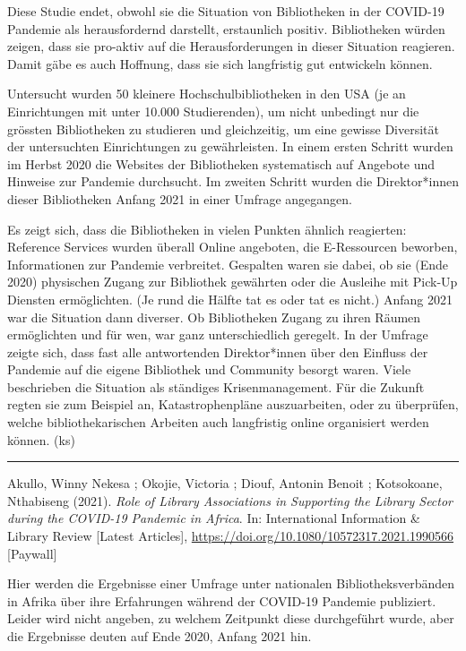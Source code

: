 \documentclass[a4paper,
fontsize=11pt,
oneside,
numbers=noperiodatend,
parskip=half-,
bibliography=totoc,
final
]{scrartcl}
\begin{document}
Diese Studie endet, obwohl sie die Situation von Bibliotheken in der
COVID-19 Pandemie als herausfordernd darstellt, erstaunlich positiv.
Bibliotheken würden zeigen, dass sie pro-aktiv auf die Herausforderungen
in dieser Situation reagieren. Damit gäbe es auch Hoffnung, dass sie
sich langfristig gut entwickeln können.

Untersucht wurden 50 kleinere Hochschulbibliotheken in den USA (je an
Einrichtungen mit unter 10.000 Studierenden), um nicht unbedingt nur die
grössten Bibliotheken zu studieren und gleichzeitig, um eine gewisse
Diversität der untersuchten Einrichtungen zu gewährleisten. In einem
ersten Schritt wurden im Herbst 2020 die Websites der Bibliotheken
systematisch auf Angebote und Hinweise zur Pandemie durchsucht. Im
zweiten Schritt wurden die Direktor*innen dieser Bibliotheken Anfang
2021 in einer Umfrage angegangen.

Es zeigt sich, dass die Bibliotheken in vielen Punkten ähnlich
reagierten: Reference Services wurden überall Online angeboten, die
E-Ressourcen beworben, Informationen zur Pandemie verbreitet. Gespalten
waren sie dabei, ob sie (Ende 2020) physischen Zugang zur Bibliothek
gewährten oder die Ausleihe mit Pick-Up Diensten ermöglichten. (Je rund
die Hälfte tat es oder tat es nicht.) Anfang 2021 war die Situation dann
diverser. Ob Bibliotheken Zugang zu ihren Räumen ermöglichten und für
wen, war ganz unterschiedlich geregelt. In der Umfrage zeigte sich, dass
fast alle antwortenden Direktor*innen über den Einfluss der Pandemie auf
die eigene Bibliothek und Community besorgt waren. Viele beschrieben die
Situation als ständiges Krisenmanagement. Für die Zukunft regten sie zum
Beispiel an, Katastrophenpläne auszuarbeiten, oder zu überprüfen, welche
bibliothekarischen Arbeiten auch langfristig online organisiert werden
können. (ks)

\begin{center}\rule{0.5\linewidth}{0.5pt}\end{center}

Akullo, Winny Nekesa ; Okojie, Victoria ; Diouf, Antonin Benoit ;
Kotsokoane, Nthabiseng (2021). \emph{Role of Library Associations in
Supporting the Library Sector during the COVID-19 Pandemic in Africa}.
In: International Information \& Library Review {[}Latest Articles{]},
\url{https://doi.org/10.1080/10572317.2021.1990566} {[}Paywall{]}

Hier werden die Ergebnisse einer Umfrage unter nationalen
Bibliotheksverbänden in Afrika über ihre Erfahrungen während der
COVID-19 Pandemie publiziert. Leider wird nicht angeben, zu welchem
Zeitpunkt diese durchgeführt wurde, aber die Ergebnisse deuten auf Ende
2020, Anfang 2021 hin.
\end{document}

